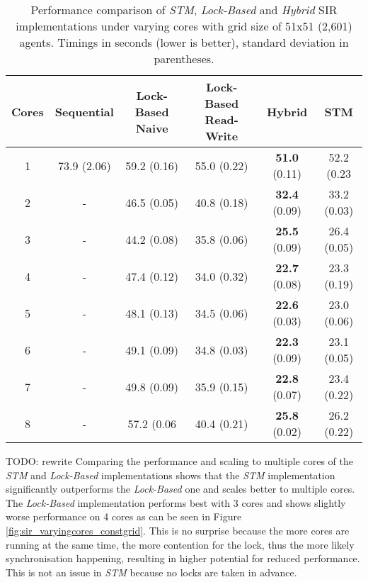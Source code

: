 \begin{table}
	\centering
  	\begin{tabular}{ c || c | c | c | c | c }
        Cores & Sequential  & Lock-Based Naive & Lock-Based Read-Write & Hybrid                & STM          \\ \hline \hline 
   		1     & 73.9 (2.06) & 59.2 (0.16)      & 55.0 (0.22)           & \textbf{51.0} (0.11)  & 52.2 (0.23   \\ \hline
   		2     & -           & 46.5 (0.05)      & 40.8 (0.18)           & \textbf{32.4} (0.09)  & 33.2 (0.03)  \\ \hline
   		3     & -           & 44.2 (0.08)      & 35.8 (0.06)           & \textbf{25.5} (0.09)  & 26.4 (0.05)  \\ \hline
   		4     & -           & 47.4 (0.12)      & 34.0 (0.32)           & \textbf{22.7} (0.08)  & 23.3 (0.19)  \\ \hline
   		5     & -           & 48.1 (0.13)      & 34.5 (0.06)           & \textbf{22.6} (0.03)  & 23.0 (0.06)  \\ \hline
   		6     & -           & 49.1 (0.09)      & 34.8 (0.03)           & \textbf{22.3} (0.09)  & 23.1 (0.05)  \\ \hline
   		7     & -           & 49.8 (0.09)      & 35.9 (0.15)           & \textbf{22.8} (0.07)  & 23.4 (0.22)  \\ \hline
   		8     & -           & 57.2 (0.06       & 40.4 (0.21)           & \textbf{25.8} (0.02)  & 26.2 (0.22)  \\ \hline \hline
  	\end{tabular}

  	\caption{Performance comparison of \textit{STM}, \textit{Lock-Based} and \textit{Hybrid} SIR implementations under varying cores with grid size of 51x51 (2,601) agents. Timings in seconds (lower is better), standard deviation in parentheses.}
	\label{tab:sir_varyingcores_constgrid}
\end{table}

TODO: rewrite 
Comparing the performance and scaling to multiple cores of the \textit{STM} and \textit{Lock-Based} implementations shows that the \textit{STM} implementation significantly outperforms the \textit{Lock-Based} one and scales better to multiple cores. The \textit{Lock-Based} implementation performs best with 3 cores and shows slightly worse performance on 4 cores as can be seen in Figure \ref{fig:sir_varyingcores_constgrid}. This is no surprise because the more cores are running at the same time, the more contention for the lock, thus the more likely synchronisation happening, resulting in higher potential for reduced performance. This is not an issue in \textit{STM} because no locks are taken in advance. 

